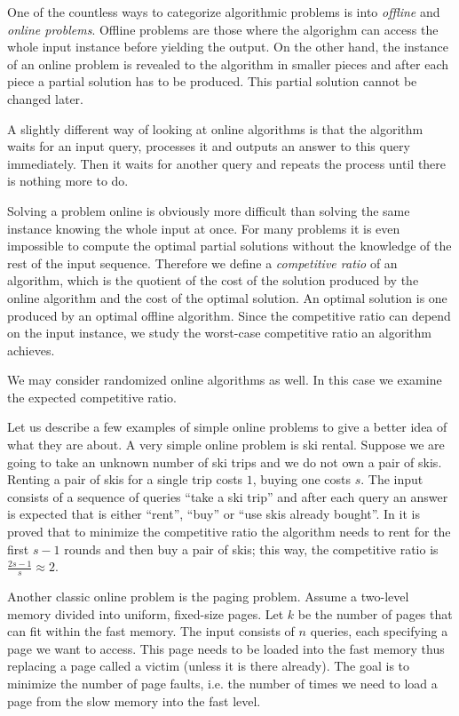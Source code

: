 One of the countless ways to categorize algorithmic problems is into
\emph{offline} and \emph{online problems}. Offline problems are those
where the algorighm can access the whole input instance before yielding
the output.  On the other hand, the instance of an online problem is
revealed to the algorithm in smaller pieces and after each piece a partial
solution has to be produced. This partial solution cannot be changed
later.

A slightly different way of looking at online algorithms is that the
algorithm waits for an input query, processes it and outputs an answer to
this query immediately. Then it waits for another query and repeats the
process until there is nothing more to do.

Solving a problem online is obviously more difficult than solving the same
instance knowing the whole input at once. For many problems it is even
impossible to compute the optimal partial solutions without the knowledge
of the rest of the input sequence. Therefore we define a \emph{competitive
ratio} of an algorithm, which is the quotient of the cost of the solution
produced by the online algorithm and the cost of the optimal solution. An
optimal solution is one produced by an optimal offline algorithm. Since
the competitive ratio can depend on the input instance, we study the
worst-case competitive ratio an algorithm achieves.

We may consider randomized online algorithms as well. In this case we
examine the expected competitive ratio.

Let us describe a few examples of simple online problems to give a better
idea of what they are about. A very simple online problem is ski rental.
Suppose we are going to take an unknown number of ski trips and we do not
own a pair of skis. Renting a pair of skis for a single trip costs $1$,
buying one costs $s$. The input consists of a sequence of queries ``take a
ski trip'' and after each query an answer is expected that is either
``rent'', ``buy'' or ``use skis already bought''. In \cite{skirental} it
is proved that to minimize the competitive ratio the algorithm needs to
rent for the first $s-1$ rounds and then buy a pair of skis; this way, the
competitive ratio is $\frac{2s-1}{s} \approx 2$.

Another classic online problem is the paging problem. Assume a two-level
memory divided into uniform, fixed-size pages. Let $k$ be the number of
pages that can fit within the fast memory. The input consists of $n$
queries, each specifying a page we want to access. This page needs to be
loaded into the fast memory thus replacing a page called a victim (unless
it is there already). The goal is to minimize the number of page faults,
i.e. the number of times we need to load a page from the slow memory into
the fast level.

